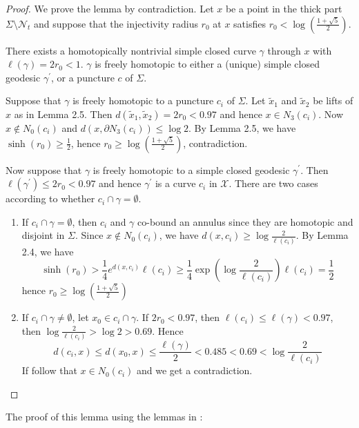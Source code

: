 \documentclass[11pt, a4paper]{article}
\theoremstyle{definition}
\theoremstyle{remark}
\newcommand{\caln}{\mathcal{N}}
\newcommand{\calx}{\mathcal{X}}
\newcommand{\bracket}[1]{\left( #1 \right)}
\begin{document}
\begin{proof}
  
We prove the lemma by contradiction. Let $x$ be a point in the thick part $\Sigma\setminus\caln_t$ and suppose that the injectivity radius $r_0$ at $x$ satisfies $r_0<\log\bracket{\frac{1+\sqrt5}2}$.

There exists a homotopically nontrivial simple closed curve $\gamma$ through $x$ with $\ell(\gamma)=2r_0<1$. $\gamma$ is freely homotopic to either a (unique) simple closed geodesic $\gamma^\prime$, or a puncture $c$ of $\Sigma$.

Suppose that $\gamma$ is freely homotopic to a puncture $c_i$ of $\Sigma$. Let $\widetilde{x}_1$ and $\widetilde{x}_2$ be lifts of $x$ as in Lemma 2.5. Then $d(\widetilde{x}_1,\widetilde{x}_2)=2r_0<0.97$ and hence $x\in N_3(c_i)$. Now $x\notin N_0(c_i)$ and $d(x,\partial N_3(c_i))\leqslant\log2$. By Lemma 2.5, we have $\sinh(r_0)\geqslant\frac12$, hence $r_0\geqslant\log\bracket{\frac{1+\sqrt5}2}$, contradiction.

Now suppose that $\gamma$ is freely homotopic to a simple closed geodesic $\gamma^\prime$. Then $\ell(\gamma^\prime)\leqslant 2r_0<0.97$ and hence $\gamma^\prime$ is a curve $c_i$ in $\calx$. There are two cases according to whether $c_i\cap \gamma=\emptyset$.

\begin{enumerate}
\item If $c_i\cap\gamma=\emptyset$, then $c_i$ and $\gamma$ co-bound an annulus since they are homotopic and disjoint in $\Sigma$. Since $x\notin N_0(c_i)$, we have $d(x,c_i)\geqslant\log\frac{2}{\ell(c_i)}$. By Lemma 2.4, we have
$$\sinh(r_0)>\frac14e^{d(x,c_i)}\ell(c_i)\geqslant\frac14\exp\bracket{\log\frac{2}{\ell(c_i)}}\ell(c_i)=\frac12$$
hence $r_0\geqslant\log\bracket{\frac{1+\sqrt5}2}$


\item 
If $c_i\cap\gamma\neq\emptyset$, let $x_0\in c_i\cap\gamma$. If $2r_0<0.97$, then $\ell(c_i)\leqslant\ell(\gamma)<0.97$, then $\log{\frac{2}{\ell(c_i)}}>\log2>0.69$. Hence 
$$d(c_i,x)\leqslant d(x_0,x)\leqslant\frac{\ell(\gamma)}2<0.485<0.69<\log{\frac{2}{\ell(c_i)}}$$
If follow that $x\in N_0(c_i)$ and we get a contradiction.
\end{enumerate}


\end{proof}

The proof of this lemma using the lemmas in \cite{Y2800}:
\end{document}
